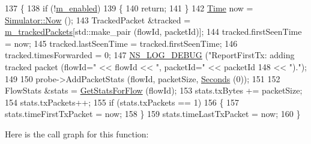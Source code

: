 \begin{DoxyCode}
137 \{
138   \textcolor{keywordflow}{if} (!\hyperlink{classns3_1_1FlowMonitor_a26ecae1b883d6625091b07e2698f0d45}{m\_enabled})
139     \{
140       \textcolor{keywordflow}{return};
141     \}
142   \hyperlink{namespacens3_1_1TracedValueCallback_a7ffd3e7c142ffe7c8a1d2db9b8de38ec}{Time} now = \hyperlink{classns3_1_1Simulator_ac3178fa975b419f7875e7105be122800}{Simulator::Now} ();
143   TrackedPacket &tracked = \hyperlink{classns3_1_1FlowMonitor_ab4f63ca5c2a927337870110fa8233bce}{m\_trackedPackets}[std::make\_pair (flowId, packetId)];
144   tracked.firstSeenTime = now;
145   tracked.lastSeenTime = tracked.firstSeenTime;
146   tracked.timesForwarded = 0;
147   \hyperlink{group__logging_ga413f1886406d49f59a6a0a89b77b4d0a}{NS\_LOG\_DEBUG} (\textcolor{stringliteral}{"ReportFirstTx: adding tracked packet (flowId="} << flowId << \textcolor{stringliteral}{", packetId="} << 
      packetId
148                                                                 << \textcolor{stringliteral}{")."});
149 
150   probe->AddPacketStats (flowId, packetSize, \hyperlink{group__timecivil_ga33c34b816f8ff6628e33d5c8e9713b9e}{Seconds} (0));
151 
152   FlowStats &stats = \hyperlink{classns3_1_1FlowMonitor_a029346e25b6b7c0e70fe269e27739a7c}{GetStatsForFlow} (flowId);
153   stats.txBytes += packetSize;
154   stats.txPackets++;
155   \textcolor{keywordflow}{if} (stats.txPackets == 1)
156     \{
157       stats.timeFirstTxPacket = now;
158     \}
159   stats.timeLastTxPacket = now;
160 \}
\end{DoxyCode}


Here is the call graph for this function\+:



